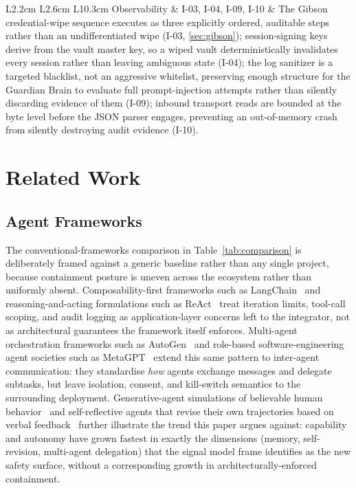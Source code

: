 \documentclass[11pt,a4paper]{article}
\begin{document}
{\begin{longtable}{L{2.2cm} L{2.6cm} L{10.3cm}}
Observability & I-03, I-04, I-09, I-10 & The Gibson credential-wipe sequence executes as three explicitly ordered, auditable steps rather than an undifferentiated wipe (I-03, \cref{sec:gibson}); session-signing keys derive from the vault master key, so a wiped vault deterministically invalidates every session rather than leaving ambiguous state (I-04); the log sanitizer is a targeted blacklist, not an aggressive whitelist, preserving enough structure for the Guardian Brain to evaluate full prompt-injection attempts rather than silently discarding evidence of them (I-09); inbound transport reads are bounded at the byte level before the JSON parser engages, preventing an out-of-memory crash from silently destroying audit evidence (I-10). \\
\end{longtable}
}

\section{Related Work}
\label{sec:relatedwork}

\subsection{Agent Frameworks}

The conventional-frameworks comparison in Table~\ref{tab:comparison} is deliberately framed
against a generic baseline rather than any single project, because containment posture is uneven
across the ecosystem rather than uniformly absent. Composability-first frameworks such as
LangChain~\cite{chase2022langchain} and reasoning-and-acting formulations such as
ReAct~\cite{yao2023react} treat iteration limits, tool-call scoping, and audit logging as
application-layer concerns left to the integrator, not as architectural guarantees the framework
itself enforces. Multi-agent orchestration frameworks such as
AutoGen~\cite{wu2023autogen} and role-based software-engineering agent societies such as
MetaGPT~\cite{hong2023metagpt} extend this same pattern to inter-agent communication: they
standardise \emph{how} agents exchange messages and delegate subtasks, but leave isolation,
consent, and kill-switch semantics to the surrounding deployment. Generative-agent simulations of
believable human behavior~\cite{park2023generative} and self-reflective agents that revise their
own trajectories based on verbal feedback~\cite{shinn2023reflexion} further illustrate the trend
this paper argues against: capability and autonomy have grown fastest in exactly the dimensions
(memory, self-revision, multi-agent delegation) that the signal model frame identifies as the new
safety surface, without a corresponding growth in architecturally-enforced containment.
\end{document}
